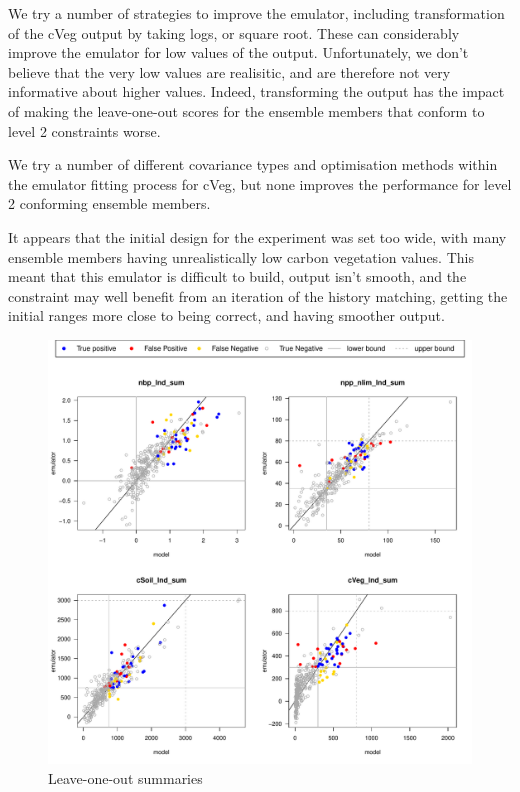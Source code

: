 \documentclass[gmd, manuscript]{copernicus}
\begin{document}
We try a number of strategies to improve the emulator, including transformation of the cVeg output by taking logs, or square root. These can considerably improve the emulator for low values of the output. Unfortunately, we don't believe that the very low values are realisitic, and are therefore not very informative about higher values. Indeed, transforming the output has the impact of making the leave-one-out scores for the ensemble members that conform to level 2 constraints worse.

We try a number of different covariance types and optimisation methods within the emulator fitting process for cVeg, but none improves the performance for level 2 conforming ensemble members.

It appears that the initial design for the experiment was set too wide, with many ensemble members having unrealistically low carbon vegetation values. This meant that this emulator is difficult to build, output isn't smooth, and the constraint may well benefit from an iteration of the history matching, getting the initial ranges more close to being correct, and having smoother output.



\begin{figure}[t]
\includegraphics[width=12cm]{./figs/Y_const_loo.pdf}
\caption{Leave-one-out summaries }
\label{fig:Y_const_loo}
\end{figure}
\end{document}
